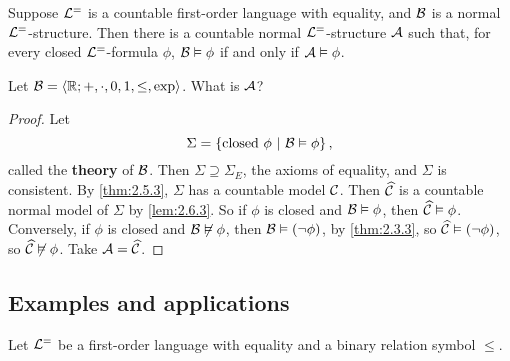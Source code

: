 
\begin{theorem}
\label{thm:2.6.6}
Suppose $ \mathcal{L}^= $ is a countable first-order language with equality, and $ \mathcal{B} $ is a normal $ \mathcal{L}^= $-structure. Then there is a countable normal $ \mathcal{L}^= $-structure $ \mathcal{A} $ such that, for every closed $ \mathcal{L}^= $-formula $ \phi $, $ \mathcal{B} \vDash \phi $ if and only if $ \mathcal{A} \vDash \phi $.
\end{theorem}

\begin{example*}
Let $ \mathcal{B} = \left\langle \mathbb{R}; +, \cdot, 0, 1, \le, \exp \right\rangle $. What is $ \mathcal{A} $?
\end{example*}

\begin{proof}
Let
$$ \Sigma = \cbr{\text{closed} \ \phi \st \BBB \vDash \phi}, $$
called the \textbf{theory} of $ \mathcal{B} $. Then $ \Sigma \supseteq \Sigma_E $, the axioms of equality, and $ \Sigma $ is consistent. By \ref{thm:2.5.3}, $ \Sigma $ has a countable model $ \mathcal{C} $. Then $ \widehat{\mathcal{C}} $ is a countable normal model of $ \Sigma $ by \ref{lem:2.6.3}. So if $ \phi $ is closed and $ \mathcal{B} \vDash \phi $, then $ \widehat{\mathcal{C}} \vDash \phi $. Conversely, if $ \phi $ is closed and $ \mathcal{B} \not\vDash \phi $, then $ \BBB \vDash \notb{\phi} $, by \ref{thm:2.3.3}, so $ \widehat{\CCC} \vDash \notb{\phi} $, so $ \widehat{\mathcal{C}} \not\vDash \phi $. Take $ \mathcal{A} = \widehat{\mathcal{C}} $.
\end{proof}

\subsection{Examples and applications}

Let $ \mathcal{L}^= $ be a first-order language with equality and a binary relation symbol $ \le $.

